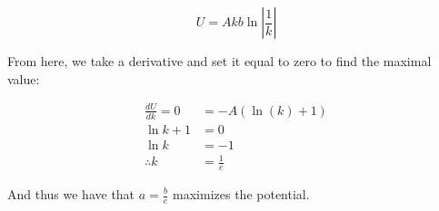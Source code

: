 \documentclass{article}
\theoremstyle{definition}
\numberwithin{equation}{section}
\numberwithin{definition}{section}
\begin{document}
    \[ U = A kb \ln \left|\frac{1}{k}\right|\]

    From here, we take a derivative and set it equal to zero to find the maximal value:

    \begin{align*}
        \frac{dU}{dk} = 0 &= -A(\ln(k)+1)\\
        \ln k + 1 &= 0\\
        \ln k &= -1\\
        \therefore k &= \frac{1}{e}
    \end{align*}

    And thus we have that $a = \frac{b}{e}$ maximizes the potential.
\end{document}

